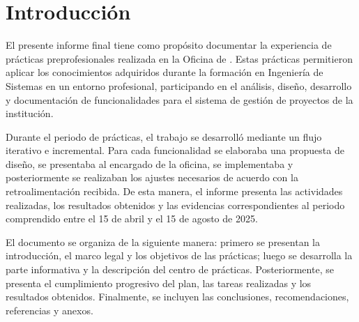 
\section*{Introducción}
{}
El presente informe final tiene como propósito documentar la experiencia de prácticas preprofesionales realizada en la Oficina de \InstitucionNombre. Estas prácticas permitieron aplicar los conocimientos adquiridos durante la formación en Ingeniería de Sistemas en un entorno profesional, participando en el análisis, diseño, desarrollo y documentación de funcionalidades para el sistema de gestión de proyectos de la institución.

Durante el periodo de prácticas, el trabajo se desarrolló mediante un flujo iterativo e incremental. Para cada funcionalidad se elaboraba una propuesta de diseño, se presentaba al encargado de la oficina, se implementaba y posteriormente se realizaban los ajustes necesarios de acuerdo con la retroalimentación recibida. De esta manera, el informe presenta las actividades realizadas, los resultados obtenidos y las evidencias correspondientes al periodo comprendido entre el 15 de abril y el 15 de agosto de 2025.

El documento se organiza de la siguiente manera: primero se presentan la introducción, el marco legal y los objetivos de las prácticas; luego se desarrolla la parte informativa y la descripción del centro de prácticas. Posteriormente, se presenta el cumplimiento progresivo del plan, las tareas realizadas y los resultados obtenidos. Finalmente, se incluyen las conclusiones, recomendaciones, referencias y anexos.
